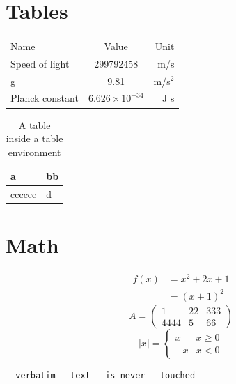 \documentclass{article}
\begin{document}
\section{Tables}
\begin{tabular}{lcr}
Name & Value & Unit\\
Speed of light & 299792458 & m/s\\
g & 9.81 & m/s$^2$\\
\hline
Planck constant & $6.626\times10^{-34}$ & J s
\end{tabular}

\begin{table}[h]
\centering
\begin{tabular}{|l|l|}
\hline
a & bb\\ \hline
cccccc & d\\ \hline
\end{tabular}
\caption{A table inside a table environment}
\end{table}
\section{Math}
\begin{align}
f(x) &= x^2+2x+1\\
&= (x+1)^2
\end{align}
\begin{equation}
A=\begin{pmatrix}
1 & 22 & 333\\
4444 & 5 & 66
\end{pmatrix}
\end{equation}
\[
|x|=\begin{cases}
x & x\geq 0\\
-x & x<0
\end{cases}
\]
\begin{verbatim}
  verbatim   text   is never   touched
\end{verbatim}
\end{document}
